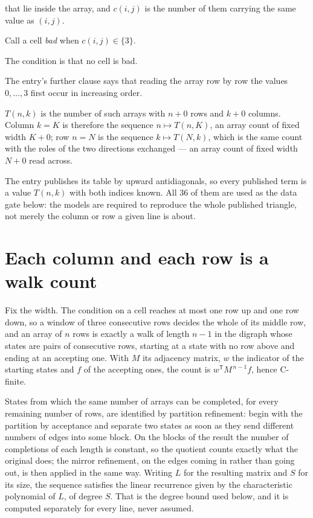 \documentclass[11pt]{article}
\theoremstyle{definition}
\begin{document}
that lie inside the array, and $c(i,j)$ is the number of them carrying the same value as $(i,j)$.

Call a cell {\itshape bad} when $c(i,j) \in \{3\}$.

The condition is that no cell is bad.

The entry's further clause says that reading the array row by row the values $0,\dots,3$ first occur in increasing order.

$T(n,k)$ is the number of such arrays with $n + 0$ rows and $k + 0$ columns. Column $k = K$ is therefore the sequence $n \mapsto T(n,K)$, an array count of fixed width $K + 0$; row $n = N$ is the sequence $k \mapsto T(N,k)$, which is the same count with the roles of the two directions exchanged --- an array count of fixed width $N + 0$ read across.

The entry publishes its table by upward antidiagonals, so every published term is a value $T(n,k)$ with both indices known. All 36 of them are used as the data gate below: the models are required to reproduce the whole published triangle, not merely the column or row a given line is about.

\section{Each column and each row is a walk count}

Fix the width. The condition on a cell reaches at most one row up and one row down, so a window of three consecutive rows decides the whole of its middle row, and an array of $n$ rows is exactly a walk of length $n-1$ in the digraph whose states are pairs of consecutive rows, starting at a state with no row above and ending at an accepting one. With $M$ its adjacency matrix, $w$ the indicator of the starting states and $f$ of the accepting ones, the count is $w^{\mathsf T}M^{\,n-1}f$, hence C-finite.

States from which the same number of arrays can be completed, for every remaining number of rows, are identified by partition refinement: begin with the partition by acceptance and separate two states as soon as they send different numbers of edges into some block. On the blocks of the result the number of completions of each length is constant, so the quotient counts exactly what the original does; the mirror refinement, on the edges coming in rather than going out, is then applied in the same way. Writing $L$ for the resulting matrix and $S$ for its size, the sequence satisfies the linear recurrence given by the characteristic polynomial of $L$, of degree $S$. That is the degree bound used below, and it is computed separately for every line, never assumed.
\end{document}
